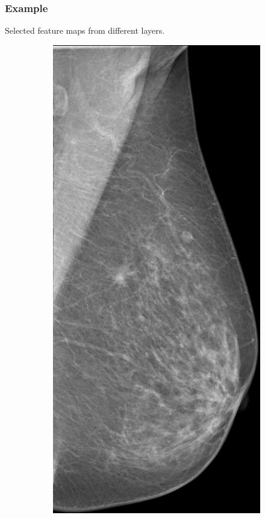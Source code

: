 \documentclass{beamer}
\begin{document}
	\begin{frame}
	    \frametitle{Example}
	    Selected feature maps from different layers.
	    
	    \begin{figure}
	        \begin{subfigure}{0.19\textwidth}
		        \centering
			        \includegraphics[width=\textwidth]{plots/layer_0.png}

\end{subfigure}
\end{figure}
\end{frame}
\end{document}
